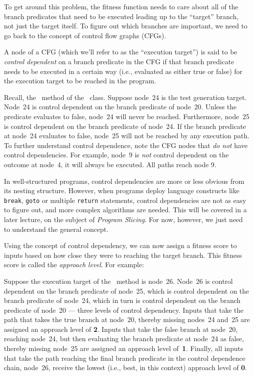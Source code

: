 To get around this problem, the fitness function needs to care about all of the
branch predicates that need to be executed leading up to the ``target'' branch,
not just the target itself. To figure out which branches are important, we need
to go back to the concept of control flow graphs (CFGs). 

A node of a CFG (which we'll refer to as the ``execution target'') is said to be
{\it control dependent} on a branch predicate in the CFG if that branch
predicate needs to be executed in a certain way (i.e., evaluated as either true
or false) for the execution target to be reached in the program. 

Recall, the \classifymethod~method of the \triangleclass~class. Suppose node~24
is the test generation target. Node~24 is control dependent on the branch
predicate of node~20. Unless the predicate evaluates to false, node~24 will
never be reached. Furthermore, node~25 is control dependent on the branch
predicate of node~24. If the branch predicate at node~24 evaluates to false,
node~25 will not be reached by any execution path. To further understand control
dependence, note the CFG nodes that {\it do not} have control dependencies. For
example, node~9 is {\it not} control dependent on the outcome at node~4, it will
always be executed. All paths reach node 9. 


In well-structured programs, control dependencies are more or less obvious from its nesting
structure. However, when programs deploy language constructs like {\tt break},
{\tt goto} or multiple {\tt return} statements, control dependencies are not as
easy to figure out, and more complex algorithms are needed. This will be
covered in a later lecture, on the subject of {\it Program Slicing}. For now,
however, we just need to understand the general concept. 

Using the concept of control dependency, we can now assign a fitness score to
inputs based on how close they were to reaching the target branch. This fitness
score is called the {\it approach level}. For example:

Suppose the execution target of the \classifymethod~method is node~26. Node~26
is control dependent on the branch predicate of node~25, which is control
dependent on the branch predicate of node~24, which in turn is control dependent
on the branch predicate of node~20 --- three levels of control dependency.
Inputs that take the path that takes the true branch at node~20, thereby missing
nodes~24 and~25 are assigned an approach level of {\bf 2}. Inputs that take the
false branch at node~20, reaching node~24, but then evaluating the branch
predicate at node~24 as false, thereby missing node~25 are assigned an approach
level of~{\bf 1}. Finally, all inputs that take the path reaching the final
branch predicate in the control dependence chain, node~26, receive the lowest
(i.e., best, in this context) approach level of {\bf 0}.

